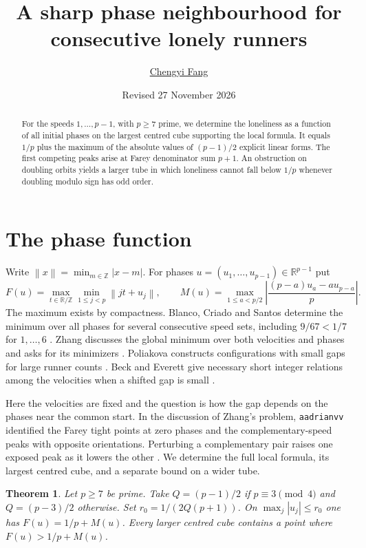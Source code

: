 \documentclass[11pt]{article}
\title{A sharp phase neighbourhood for consecutive lonely runners}
\author{\href{https://orcid.org/0009-0006-1237-7763}{Chengyi Fang}}
\date{Revised 27 November 2026}
\newtheorem{theorem}{Theorem}
\newcommand{\dist}[1]{\left\lVert #1\right\rVert}
\begin{document}
\maketitle
\begin{abstract}
For the speeds $1,\ldots,p-1$, with $p\ge7$ prime, we determine the
loneliness as a function of all initial phases on the largest centred
cube supporting the local formula. It equals $1/p$ plus the maximum
of the absolute values of $(p-1)/2$ explicit linear forms. The first
competing peaks arise at Farey denominator sum $p+1$. An obstruction
on doubling orbits yields a larger tube in which loneliness cannot
fall below $1/p$ whenever doubling modulo sign has odd order.
\end{abstract}

\section{The phase function}
Write $\dist{x}=\min_{m\in\mathbb Z}|x-m|$. For phases
$u=(u_1,\ldots,u_{p-1})\in\mathbb R^{p-1}$ put
\[
 F(u)=\max_{t\in\mathbb R/\mathbb Z}\min_{1\le j<p}\dist{jt+u_j},
 \qquad
 M(u)=\max_{1\le a<p/2}\left|\frac{(p-a)u_a-au_{p-a}}p\right|.
\]
The maximum exists by compactness. Blanco, Criado and Santos
determine the minimum over all phases for several consecutive speed
sets, including $9/67<1/7$ for $1,\ldots,6$
\cite[Prop.~5.12(2)]{bcs}. Zhang discusses the global minimum over both
velocities and phases and asks for its minimizers \cite[Question~8.5]{zhang}.
Poliakova constructs configurations with small gaps for large runner
counts \cite{pol}. Beck and Everett give necessary short integer
relations among the velocities when a shifted gap is small
\cite[Prop.~4 and Thm.~5]{be}.

Here the velocities are fixed and the question is how the gap depends on
the phases near the common start. In the discussion of Zhang's problem,
\texttt{aadrianvv} identified the Farey tight points at zero phases and
the complementary-speed peaks with opposite orientations. Perturbing
a complementary pair raises one exposed peak as it lowers the other
\cite{aadrianvv}. We determine the full local formula, its largest
centred cube, and a separate bound on a wider tube.

\begin{theorem}\label{main}
Let $p\ge7$ be prime. Take $Q=(p-1)/2$ if $p\equiv3\pmod4$ and
$Q=(p-3)/2$ otherwise. Set $r_0=1/(2Q(p+1))$. On
$\max_j|u_j|\le r_0$ one has $F(u)=1/p+M(u)$.
Every larger centred cube contains a point where $F(u)>1/p+M(u)$.
\end{theorem}
\end{document}
